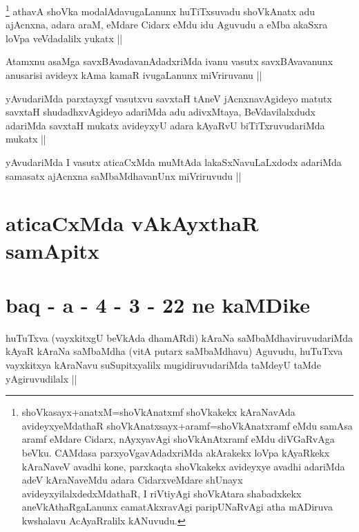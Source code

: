 \begin{artha}
\footnote{shoVkasayx+anatxM=shoVkAnatxmf shoVkakekx kAraNavAda avideyxyeMdathaR shoVkAnatxsayx+aramf=shoVkAnatxramf eMdu samAsa aramf eMdare Cidarx, nAyxyavAgi shoVkAnAtxramf eMdu diVGaRvAga beVku. CAMdasa parxyoVgavAdadxriMda akArakekx loVpa kAyaRkekx kAraNaveV avadhi kone, parxkaqta shoVkakekx avideyxye avadhi adariMda adeV kAraNaveMdu adara CidarxveMdare shUnayx avideyxyilalxdedxMdathaR, I riVtiyAgi shoVkAtara shabadxkekx aneVkAthaRgaLanunx camatAkxravAgi paripUNaRvAgi atha mADiruva kwshalavu AcAyaRralilx kANuvudu.}
athavA shoVka modalAdavugaLanunx huTiTxsuvadu shoVkAnatx adu ajAcnxna, adara araM, eMdare Cidarx eMdu idu Aguvudu a eMba akaSxra loVpa veVdadalilx yukatx ||
\end{artha}


\begin{artha}
Atamxnu asaMga savxBAvadavanAdadxriMda ivanu vasutx savxBAvavanunx anusarisi avideyx kAma kamaR ivugaLanunx miVriruvanu ||
\end{artha}


\begin{artha}
yAvudariMda parxtayxgf vasutxvu savxtaH tAneV jAcnxnavAgideyo matutx savxtaH shudadhxvAgideyo adariMda adu adivxMtaya, BeVdavilalxdudx adariMda savxtaH mukatx avideyxyU adara kAyaRvU biTiTxruvudariMda mukatx ||
\end{artha}


\begin{artha}
yAvudariMda I vasutx aticaCxMda muMtAda lakaSxNavuLaLxdodx adariMda samasatx ajAcnxna saMbaMdhavanUnx miVriruvudu ||
\end{artha}

\section*{aticaCxMda vAkAyxthaR samApitx}

\section*{baq - a - 4 - 3 - 22 ne kaMDike}


\begin{artha}
huTuTxva (vayxkitxgU beVkAda dhamARdi) kAraNa saMbaMdhaviruvudariMda kAyaR kAraNa saMbaMdha (vitA putarx saMbaMdhavu) Aguvudu, huTuTxva vayxkitxya kAraNavu suSupitxyalilx mugidiruvudariMda taMdeyU taMde yAgiruvudilalx ||
\end{artha}

